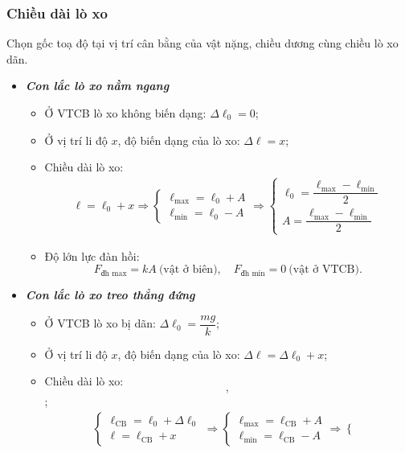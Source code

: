 \subsubsection{Chiều dài lò xo}
Chọn gốc toạ độ tại vị trí cân bằng của vật nặng, chiều dương cùng chiều lò xo dãn.
\begin{itemize}
	\item \textbf{\textit{Con lắc lò xo nằm ngang}}
	\begin{itemize}
		\item Ở VTCB lò xo không biến dạng: $\Delta\ell_0=0$;
		\item Ở vị trí li độ $x$, độ biến dạng của lò xo: $\Delta\ell=x$;
		\item Chiều dài lò xo:
		\begin{align*}
			\ell=\ell_0+x\Rightarrow
			\begin{cases}
				\ell_\text{max}=\ell_0+A\\
				\ell_\text{min}=\ell_0-A
			\end{cases}
		\Rightarrow 
		\begin{cases}
			\ell_0=\dfrac{\ell_\text{max}-\ell_\text{min}}{2}\\
			A=\dfrac{\ell_\text{max}-\ell_\text{min}}{2}
		\end{cases}
		\end{align*}
		\item Độ lớn lực đàn hồi:\\
		$$F_\text{đh max}=kA\ \text{(vật ở biên)}, \quad F_\text{đh min}=0\ \text{(vật ở VTCB)}.$$
	\end{itemize}
\item \textbf{\textit{Con lắc lò xo treo thẳng đứng}}
\begin{itemize}
	\item Ở VTCB lò xo bị dãn: $\Delta\ell_0=\dfrac{mg}{k}$;
	\item Ở vị trí li độ $x$, độ biến dạng của lò xo: $\Delta\ell=\Delta\ell_0+x$;
	\item Chiều dài lò xo: $$, $$;
	\begin{align*}
		\begin{cases}
			\ell_\text{CB}=\ell_0+\Delta\ell_0\\
			\ell=\ell_\text{CB}+x
		\end{cases}
		\Rightarrow
		\begin{cases}
			\ell_\text{max}=\ell_\text{CB}+A\\
			\ell_\text{min}=\ell_\text{CB}-A
		\end{cases}
		\Rightarrow 
		\begin{cases}

\end{cases}
\end{align*}
\end{itemize}
\end{itemize}
